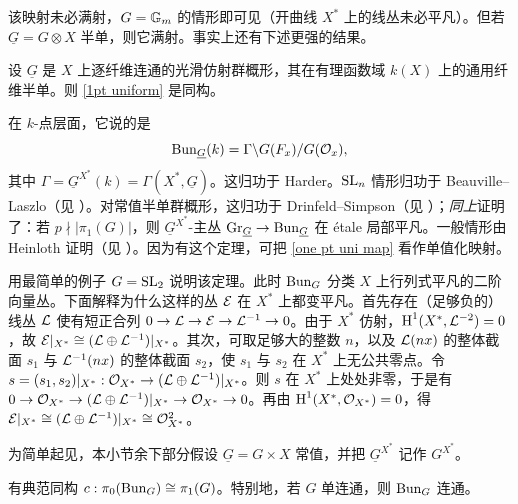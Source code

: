 该映射未必满射，$G={\mathbb G}_m$ 的情形即可见（开曲线 $X^*$ 上的线丛未必平凡）。但若 $\underline G=G\otimes X$ 半单，则它满射。事实上还有下述更强的结果。

\begin{thm}
设 $\underline G$ 是 $X$ 上逐纤维连通的光滑仿射群概形，其在有理函数域 $k(X)$ 上的通用纤维半单。则 \eqref{1pt uniform} 是同构。
\end{thm}

在 $k$-点层面，它说的是
\[{\operatorname{Bun}}_{\underline G}(k)= \Gamma\backslash G(F_x)/G({\mathcal O}_x),\]
其中 $\Gamma=\underline G^{X^*}(k)=\Gamma(X^*,\underline G)$。这归功于 Harder。${\operatorname{SL}}_n$ 情形归功于 Beauville--Laszlo（见 \cite{BL}）。对常值半单群概形，这归功于 Drinfeld--Simpson（见 \cite{DS}）；\emph{同上}证明了：若 $p\nmid|\pi_1(G)|$，则 $\underline G^{X^*}$-主丛 ${\operatorname{Gr}}_{\underline G}\to {\operatorname{Bun}}_{\underline G}$ 在 \'etale 局部平凡。一般情形由 Heinloth 证明（见 \cite{He}）。因为有这个定理，可把 \eqref{one pt uni map} 看作单值化映射。

\begin{ex}
用最简单的例子 $G={\operatorname{SL}}_2$ 说明该定理。此时 ${\operatorname{Bun}}_G$ 分类 $X$ 上行列式平凡的二阶向量丛。下面解释为什么这样的丛 ${\mathcal E}$ 在 $X^*$ 上都变平凡。首先存在（足够负的）线丛 ${\mathcal L}$ 使有短正合列 $0\to {\mathcal L}\to {\mathcal E}\to {\mathcal L}^{-1}\to 0$。由于 $X^*$ 仿射，$\operatorname{H}^1(X^*,{\mathcal L}^{-2})=0$，故 ${\mathcal E}|_{X^*}\cong ({\mathcal L}\oplus{\mathcal L}^{-1})|_{X^*}$。其次，可取足够大的整数 $n$，以及 ${\mathcal L}(nx)$ 的整体截面 $s_1$ 与 ${\mathcal L}^{-1}(nx)$ 的整体截面 $s_2$，使 $s_1$ 与 $s_2$ 在 $X^*$ 上无公共零点。令 $s=(s_1,s_2)|_{X^*}:{\mathcal O}_{X^*}\to ({\mathcal L}\oplus{\mathcal L}^{-1})|_{X^*}$。则 $s$ 在 $X^*$ 上处处非零，于是有 $0\to {\mathcal O}_{X^*}\to ({\mathcal L}\oplus{\mathcal L}^{-1})|_{X^*}\to {\mathcal O}_{X^*}\to 0$。再由 $\operatorname{H}^1(X^*,{\mathcal O}_{X^*})=0$，得 ${\mathcal E}|_{X^*}\cong ({\mathcal L}\oplus{\mathcal L}^{-1})|_{X^*}\cong {\mathcal O}_{X^*}^2$。
\end{ex}

为简单起见，本小节余下部分假设 $\underline G=G\times X$ 常值，并把 $\underline G^{X^*}$ 记作 $G^{X^*}$。

\begin{cor}
有典范同构 $c:\pi_0({\operatorname{Bun}}_G)\cong \pi_1(G)$。特别地，若 $G$ 单连通，则 ${\operatorname{Bun}}_G$ 连通。
\end{cor}

